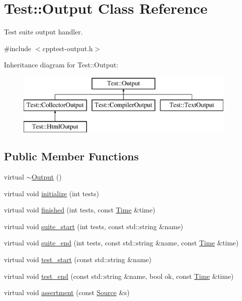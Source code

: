 \hypertarget{class_test_1_1_output}{}\section{Test\+:\+:Output Class Reference}
\label{class_test_1_1_output}


Test suite output handler.  




{\ttfamily \#include $<$cpptest-\/output.\+h$>$}

Inheritance diagram for Test\+:\+:Output\+:\begin{figure}[H]
\begin{center}
\leavevmode
\includegraphics[height=3.000000cm]{class_test_1_1_output}
\end{center}
\end{figure}
\subsection*{Public Member Functions}
\begin{DoxyCompactItemize}
\item 
virtual \hyperlink{class_test_1_1_output_a838de994609ac3d13b7d7cd389f56090}{$\sim$\+Output} ()
\item 
virtual void \hyperlink{class_test_1_1_output_aa66480875d088befc6c23ecfd1107cc1}{initialize} (int tests)
\item 
virtual void \hyperlink{class_test_1_1_output_aeff8af8326a8c54a38199f76837f860a}{finished} (int tests, const \hyperlink{class_test_1_1_time}{Time} \&time)
\item 
virtual void \hyperlink{class_test_1_1_output_a7022c32c5a1577b10b93d3942746f17d}{suite\+\_\+start} (int tests, const std\+::string \&name)
\item 
virtual void \hyperlink{class_test_1_1_output_a6dbf4c0adb2bd4a7364c629179f788a6}{suite\+\_\+end} (int tests, const std\+::string \&name, const \hyperlink{class_test_1_1_time}{Time} \&time)
\item 
virtual void \hyperlink{class_test_1_1_output_a52d43b97609febc5abbc6da9aa0abac2}{test\+\_\+start} (const std\+::string \&name)
\item 
virtual void \hyperlink{class_test_1_1_output_a3796943e3b56373492c957212a21454e}{test\+\_\+end} (const std\+::string \&name, bool ok, const \hyperlink{class_test_1_1_time}{Time} \&time)
\item 
virtual void \hyperlink{class_test_1_1_output_a48c31f0baa7627d81939be840c9a7f65}{assertment} (const \hyperlink{class_test_1_1_source}{Source} \&s)
\end{DoxyCompactItemize}
